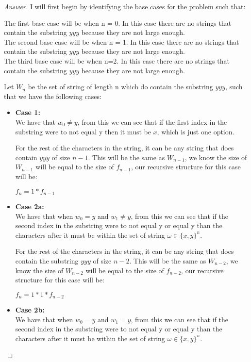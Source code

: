 \documentclass[11pt]{article}
\theoremstyle{definition}
\theoremstyle{definition}
\theoremstyle{definition}
\begin{document}
\begin{proof}[Answer]
I will first begin by identifying the base cases for the problem such that: \\
\begin{center}
The first base case will be when n = 0. In this case there are no strings that contain the substring $yyy$ because they are not large enough.\\
The second base case will be when n = 1. In this case there are no strings that contain the substring $yyy$ because they are not large enough.\\
The third base case will be when n=2. In this case there are no strings that contain the substring $yyy$ because they are not large enough.
\end{center}
Let $W_n$ be the set of string of length n which do contain the substring $yyy$, such that we have the following cases: \\
\begin{itemize}
\item \textbf{Case 1:} \\
We have that $w_0 \neq y$, from this we can see that if the first index in the substring were to not equal y then it must be $x$, which is just one option.

For the rest of the characters in the string, it can be any string that does contain $yyy$ of size $n-1$. This will be the same as $W_{n-1}$, we know the size of $W_{n-1}$ will be equal to the size of $f_{n-1}$, our recursive structure for this case will be: \\
\begin{center}
$f_n = 1 * f_{n-1}$
\end{center}
\item \textbf{Case 2a:} \\
We have that when $w_0 = y$ and $w_1 \neq y$, from this we can see that if the second index in the substring were to not equal y or equal y than the characters after it must be within the set of string $\omega \in \{x, y\}^{n}$. 

For the rest of the characters in the string, it can be any string that does contain the substring $yyy$ of size $n-2$. This will be the same as $W_{n-2}$, we know the size of $W_{n-2}$ will be equal to the size of $f_{n-2}$, our recursive structure for this case will be: \\
\begin{center}
$f_n = 1 * 1 * f_{n-2}$
\end{center}
\item \textbf{Case 2b:} \\
We have that when $w_0 = y$ and $w_1 = y$, from this we can see that if the second index in the substring were to not equal y or equal y than the characters after it must be within the set of string $\omega \in \{x, y\}^{n}$. 


\end{itemize}
\end{proof}
\end{document}

